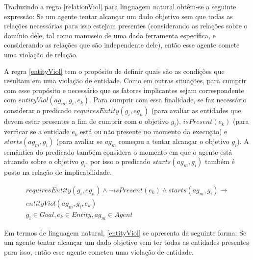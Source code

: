 Traduzindo a regra \ref{relationViol} para linguagem natural obtêm-se a seguinte expressão: Se um agente tentar alcançar um dado objetivo sem que todas as relações necessárias para isso estejam presentes (considerando as relações sobre o domínio dele, tal como manuseio de uma dada ferramenta específica, e considerando as relações que são independente dele), então esse agente comete uma violação de relação. 

A regra \ref{entityViol} tem o propósito de definir quais são as condições que resultam em uma violação de entidade. Como em outras situações, para cumprir com esse propósito e necessário que os fatores implicantes sejam correspondente com $entityViol(ag_m,g_i,e_k)$. Para cumprir com essa finalidade, se faz necessário considerar o predicado $requiresEntity(g_i,eg_n)$ (para avaliar as entidades que devem estar presentes a fim de cumprir com o objetivo $g_i$), $isPresent(e_k)$ (para verificar se a entidade $e_k$ está ou não presente no momento da execução) e $starts(ag_m,g_i)$ (para avaliar se $ag_m$ começou a tentar alcançar o objetivo $g_i$). A semântica do predicado também considera o momento em que o agente está atuando sobre o objetivo $g_i$, por isso o predicado $starts(ag_m,g_i)$ também é posto na relação de implicabilidade.

\begin{eqnarray}\label{entityViol}\nonumber
	requiresEntity(g_i,eg_n) \wedge \neg isPresent(e_k) \wedge starts(ag_m,g_i) \to \nonumber \\ 
    entityViol(ag_m,g_i,e_k)  \nonumber \\  
    g_i \in Goal, e_k \in Entity, ag_m \in Agent
\end{eqnarray}

Em termos de linguagem natural, \ref{entityViol} se apresenta da seguinte forma: Se um agente tentar alcançar um dado objetivo sem ter todas as entidades presentes para isso, então esse agente cometeu uma violação de entidade.

